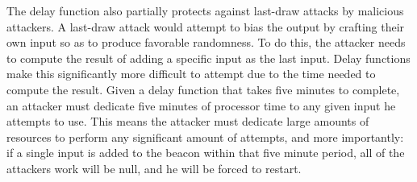 
The delay function also partially protects against last-draw attacks by malicious attackers. A last-draw attack would attempt to bias the output by crafting their own input so as to produce favorable randomness. To do this, the attacker needs to compute the result of adding a specific input as the last input. Delay functions make this significantly more difficult to attempt due to the time needed to compute the result. Given a delay function that takes five minutes to complete, an attacker must dedicate five minutes of processor time to any given input he attempts to use. This means the attacker must dedicate large amounts of resources to perform any significant amount of attempts, and more importantly: if a single input is added to the beacon within that five minute period, all of the attackers work will be null, and he will be forced to restart.

